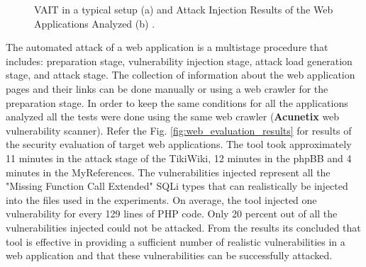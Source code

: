 \documentclass[pdftex,english,oribibl]{llncs}
\begin{document}
\begin{figure}[h]
	\centering
	\caption{VAIT in a typical setup (a) and Attack Injection Results of the Web Applications Analyzed (b) \cite{6629992_Fronseca}.}
	\label{fig:vait}
\end{figure}
The automated attack of a web application is a multistage procedure that includes: preparation stage, vulnerability injection stage, attack load generation stage, and attack stage. The collection of information about the web application pages and their links can be done manually or using a web crawler for the preparation stage. In order to keep the same conditions for all the applications analyzed all the tests were done using the same web crawler (\textbf{Acunetix} web vulnerability scanner). Refer the Fig. \ref{fig:web_evaluation_results} for results of the security evaluation of target web applications. The tool took approximately 11 minutes in the attack stage of the TikiWiki, 12 minutes in the phpBB and 4 minutes in the MyReferences. The vulnerabilities injected represent all the "Missing Function Call Extended" SQLi types that can realistically be injected into the files used in the experiments. On average, the tool injected one vulnerability for every 129 lines of PHP code. Only 20 percent out of all the vulnerabilities injected could not be attacked. From the results its concluded that tool is effective in providing a sufficient number of realistic vulnerabilities in a web application and that these vulnerabilities can be successfully attacked. 
\end{document}
